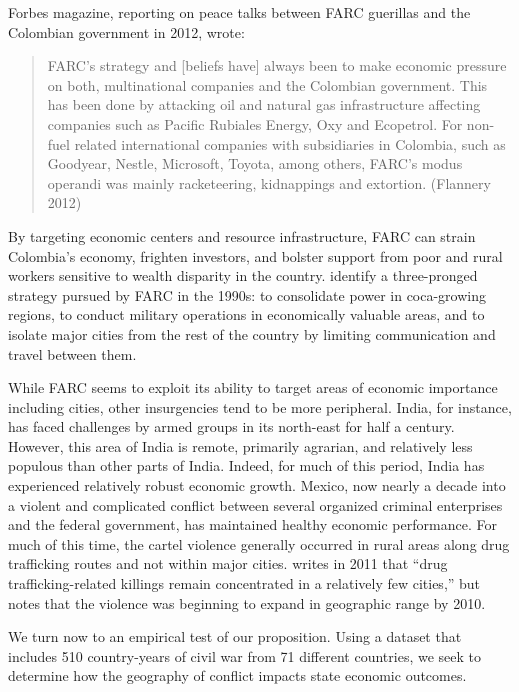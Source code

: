 Forbes magazine, reporting on peace talks between FARC guerillas and the Colombian government in 2012, wrote: 
\begin{quote}FARC's strategy and [beliefs have] always been to make economic pressure on both, multinational companies and the Colombian government. This has been done by attacking oil and natural gas infrastructure affecting companies such as Pacific Rubiales Energy, Oxy and Ecopetrol. For non-fuel related international companies with subsidiaries in Colombia, such as Goodyear, Nestle, Microsoft, Toyota, among others, FARC’s modus operandi was mainly racketeering, kidnappings and extortion. (Flannery 2012)\end{quote}
By targeting economic centers and resource infrastructure, FARC can strain Colombia's economy, frighten investors, and bolster support from poor and rural workers sensitive to wealth disparity in the country. \cite{rabasa:chalk:2001} identify a three-pronged strategy pursued by FARC in the 1990s: to consolidate power in coca-growing regions, to conduct military operations in economically valuable areas, and to isolate major cities from the rest of the country by limiting communication and travel between them.   

While FARC seems to exploit its ability to target areas of economic importance including cities, other insurgencies tend to be more peripheral. India, for instance, has faced challenges by armed groups in its north-east for half a century. However, this area of India is remote, primarily agrarian, and relatively less populous than other parts of India. Indeed, for much of this period, India has experienced relatively robust economic growth. Mexico, now nearly a decade into a violent and complicated conflict between several organized criminal enterprises and the federal government, has maintained healthy economic performance. For much of this time, the cartel violence generally occurred in rural areas along drug trafficking routes and not within major cities. \cite{beittel:2011} writes in 2011 that ``drug trafficking-related killings remain concentrated in a relatively few cities,'' but notes that the violence was beginning to expand in geographic range by 2010.

We turn now to an empirical test of our proposition. Using a dataset that includes 510 country-years of civil war from 71 different countries, we seek to determine how the geography of conflict impacts state economic outcomes.


%
